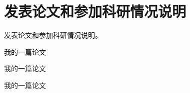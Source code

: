 \chapter{发表论文和参加科研情况说明}

发表论文和参加科研情况说明。
\begin{enumerate}[label={[\arabic*]}]
    \item 我的一篇论文
    \item 我的一篇论文
    \item 我的一篇论文
\end{enumerate}